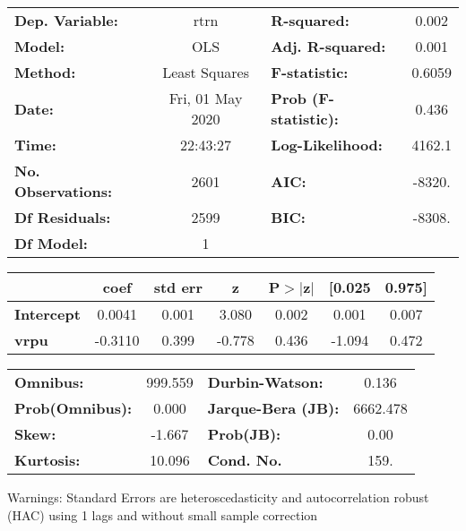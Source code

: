 \begin{center}
\begin{tabular}{lclc}
\toprule
\textbf{Dep. Variable:}    &       rtrn       & \textbf{  R-squared:         } &     0.002   \\
\textbf{Model:}            &       OLS        & \textbf{  Adj. R-squared:    } &     0.001   \\
\textbf{Method:}           &  Least Squares   & \textbf{  F-statistic:       } &    0.6059   \\
\textbf{Date:}             & Fri, 01 May 2020 & \textbf{  Prob (F-statistic):} &    0.436    \\
\textbf{Time:}             &     22:43:27     & \textbf{  Log-Likelihood:    } &    4162.1   \\
\textbf{No. Observations:} &        2601      & \textbf{  AIC:               } &    -8320.   \\
\textbf{Df Residuals:}     &        2599      & \textbf{  BIC:               } &    -8308.   \\
\textbf{Df Model:}         &           1      & \textbf{                     } &             \\
\bottomrule
\end{tabular}
\begin{tabular}{lcccccc}
                   & \textbf{coef} & \textbf{std err} & \textbf{z} & \textbf{P$> |$z$|$} & \textbf{[0.025} & \textbf{0.975]}  \\
\midrule
\textbf{Intercept} &       0.0041  &        0.001     &     3.080  &         0.002        &        0.001    &        0.007     \\
\textbf{vrpu}      &      -0.3110  &        0.399     &    -0.778  &         0.436        &       -1.094    &        0.472     \\
\bottomrule
\end{tabular}
\begin{tabular}{lclc}
\textbf{Omnibus:}       & 999.559 & \textbf{  Durbin-Watson:     } &    0.136  \\
\textbf{Prob(Omnibus):} &   0.000 & \textbf{  Jarque-Bera (JB):  } & 6662.478  \\
\textbf{Skew:}          &  -1.667 & \textbf{  Prob(JB):          } &     0.00  \\
\textbf{Kurtosis:}      &  10.096 & \textbf{  Cond. No.          } &     159.  \\
\bottomrule
\end{tabular}
\end{center}

Warnings: \newline
 [1] Standard Errors are heteroscedasticity and autocorrelation robust (HAC) using 1 lags and without small sample correction